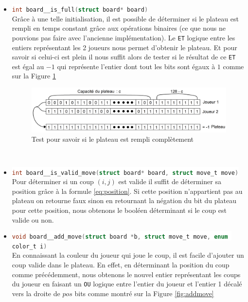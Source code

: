 \documentclass[a4paper,11pt]{article}
\newcommand{\inlinecode}[2]{\colorbox{white}{\lstinline[language=#1]$#2$}}
\begin{document}
\begin{itemize}
    \\ Ce choix a un prix, il est lourd au départ de la partie cependant il permet d'optimiser le temps nécessaire afin de savoir si le plateau est rempli ou non.
    \\
    \item[$\bullet$]
    \inlinecode{C}{int board__is_full(struct board* board)}
    \\ Grâce à une telle initialisation, il est possible de déterminer si le plateau est rempli en temps constant grâce aux opérations binaires (ce que nous ne pouvions pas faire avec l'ancienne implémentation). Le \verb+ET+ logique entre les entiers représentant les 2 joueurs nous permet d'obtenir le plateau. Et pour savoir si celui-ci est plein il nous suffit alors de tester si le résultat de ce \verb+ET+ est égal au $-1$ qui représente l'entier dont tout les bits sont égaux à $1$ comme sur la Figure \ref{fig:boardfull}
    \begin{figure}[h]
    \centering
    \includegraphics[scale=0.20]{board_full.png}
    \caption{Test pour savoir si le plateau est rempli complètement}
    \label{fig:boardfull}
    \end{figure}
    \\
    \item[$\bullet$]
    \inlinecode{C}{int board__is_valid_move(struct board* board, struct move_t move)}
    \\ Pour déterminer si un coup $(i,j)$ est valide il suffit de déterminer sa position grâce à la formule \ref{eq:position}.
    Si cette position n'appartient pas au plateau on retourne faux sinon en retournant la négation du bit du plateau pour cette position, nous obtenons le booléen déterminant si le coup est valide ou non.
    \\
    \item[$\bullet$]
    \inlinecode{C}{void board__add_move(struct board *b, struct move_t move, enum color_t i)}
    \\
    En connaissant la couleur du joueur qui joue le coup, il est facile d'ajouter un coup valide dans le plateau. En effet, en déterminant la position du coup comme précédemment, nous obtenons le nouvel entier représentant les coups du joueur en faisant un \verb+OU+ logique entre l'entier du joueur et l'entier 1 décalé vers la droite de $pos$ bits comme montré sur la Figure \ref{fig:addmove}

\end{itemize}
\end{document}
